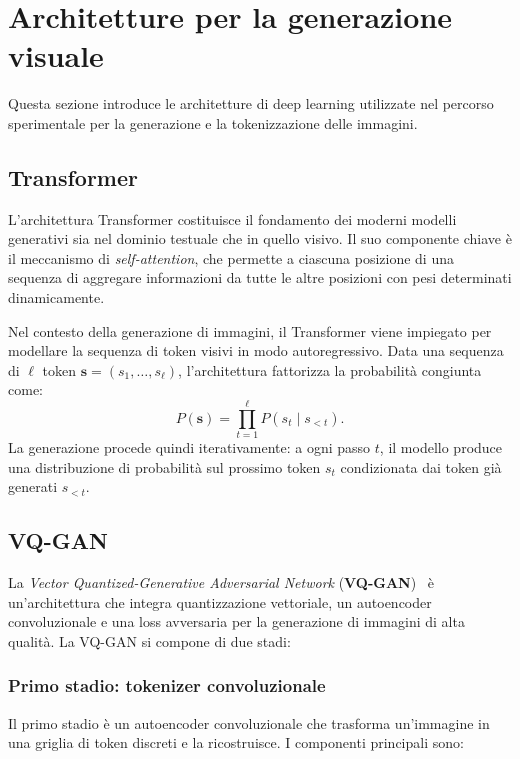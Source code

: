 \section{Architetture per la generazione visuale}

Questa sezione introduce le architetture di deep learning utilizzate nel percorso sperimentale per la generazione e la tokenizzazione delle immagini.

\subsection{Transformer}

L'architettura Transformer \cite{vaswani-2017} costituisce il fondamento dei moderni modelli generativi sia nel dominio testuale che in quello visivo. Il suo componente chiave è il meccanismo di \emph{self-attention}, che permette a ciascuna posizione di una sequenza di aggregare informazioni da tutte le altre posizioni con pesi determinati dinamicamente.

Nel contesto della generazione di immagini, il Transformer viene impiegato per modellare la sequenza di token visivi in modo autoregressivo. Data una sequenza di $\ell$ token $\mathbf{s} = (s_1, \dots, s_\ell)$, l'architettura fattorizza la probabilità congiunta come:
\[
P(\mathbf{s}) = \prod_{t=1}^\ell P(s_t \mid s_{<t}).
\]
La generazione procede quindi iterativamente: a ogni passo $t$, il modello produce una distribuzione di probabilità sul prossimo token $s_t$ condizionata dai token già generati $s_{<t}$.

\subsection{VQ-GAN}

La \emph{Vector Quantized-Generative Adversarial Network} (\textbf{VQ-GAN})~\cite{esser-2020} è un'architettura che integra quantizzazione vettoriale, un autoencoder convoluzionale e una loss avversaria per la generazione di immagini di alta qualità. La VQ-GAN si compone di due stadi:

\subsubsection{Primo stadio: tokenizer convoluzionale}

Il primo stadio è un autoencoder convoluzionale che trasforma un'immagine in una griglia di token discreti e la ricostruisce. I componenti principali sono:

